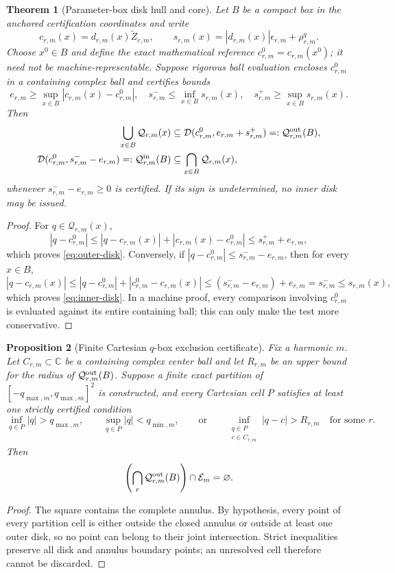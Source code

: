 \documentclass[11pt]{article}
\newtheorem{theorem}{Theorem}
\newtheorem{proposition}[theorem]{Proposition}
\theoremstyle{definition}
\theoremstyle{remark}
\newcommand{\C}{\mathbb C}
\newcommand{\Eset}{\mathcal E}
\begin{document}
\begin{theorem}[Parameter-box disk hull and core]
\label{thm:hull-core}
Let \(B\) be a compact box in the anchored certification coordinates and write
\[
 c_{r,m}(x)=d_{r,m}(x)\widetilde Z_{r,m},\qquad
 s_{r,m}(x)=|d_{r,m}(x)|\epsilon_{r,m}+\rho^q_{r,m}.
\]
Choose \(x^0\in B\) and define the exact mathematical reference
\(c^0_{r,m}=c_{r,m}(x^0)\); it need not be machine-representable.  Suppose
rigorous ball evaluation encloses \(c^0_{r,m}\) in a containing complex ball
and certifies bounds
\[
 e_{r,m}\ge\sup_{x\in B}|c_{r,m}(x)-c^0_{r,m}|,\quad
 s^-_{r,m}\le\inf_{x\in B}s_{r,m}(x),\quad
 s^+_{r,m}\ge\sup_{x\in B}s_{r,m}(x).
\]
Then
\begin{align}
 \bigcup_{x\in B}\mathcal Q_{r,m}(x)
 &\subseteq
 \mathcal D(c^0_{r,m},e_{r,m}+s^+_{r,m})
 =:\mathcal Q^{\rm out}_{r,m}(B),\label{eq:outer-disk}\\
 \mathcal D(c^0_{r,m},s^-_{r,m}-e_{r,m})
 =:\mathcal Q^{\rm in}_{r,m}(B)
 &\subseteq
 \bigcap_{x\in B}\mathcal Q_{r,m}(x),\label{eq:inner-disk}
\end{align}
whenever \(s^-_{r,m}-e_{r,m}\ge0\) is certified.  If its sign is
undetermined, no inner disk may be issued.
\end{theorem}
\begin{proof}
For \(q\in\mathcal Q_{r,m}(x)\),
\[
 |q-c^0_{r,m}|
 \le |q-c_{r,m}(x)|+|c_{r,m}(x)-c^0_{r,m}|
 \le s^+_{r,m}+e_{r,m},
\]
which proves \eqref{eq:outer-disk}.  Conversely, if
\(|q-c^0_{r,m}|\le s^-_{r,m}-e_{r,m}\), then for every \(x\in B\),
\[
 |q-c_{r,m}(x)|
 \le |q-c^0_{r,m}|+|c^0_{r,m}-c_{r,m}(x)|
 \le (s^-_{r,m}-e_{r,m})+e_{r,m}
 =s^-_{r,m}\le s_{r,m}(x),
\]
which proves \eqref{eq:inner-disk}.
In a machine proof, every comparison involving \(c^0_{r,m}\) is evaluated
against its entire containing ball; this can only make the test more
conservative.
\end{proof}

\begin{proposition}[Finite Cartesian \(q\)-box exclusion certificate]
\label{prop:qbox-cover}
Fix a harmonic \(m\).  Let \(C_{r,m}\subset\C\) be a containing complex
center ball and let \(R_{r,m}\) be an upper bound for the radius of
\(\mathcal Q^{\rm out}_{r,m}(B)\).  Suppose a finite exact partition of
\([-q_{\max,m},q_{\max,m}]^2\) is constructed, and every Cartesian cell
\(P\) satisfies at least one strictly certified condition
\[
 \inf_{q\in P}|q|>q_{\max,m},\qquad
 \sup_{q\in P}|q|<q_{\min,m},\qquad\text{or}\qquad
 \inf_{\substack{q\in P\\c\in C_{r,m}}}|q-c|>R_{r,m}
 \quad\text{for some }r.
\]
Then
\[
 \left(\bigcap_r\mathcal Q^{\rm out}_{r,m}(B)\right)
 \cap\Eset_m=\varnothing.
\]
\end{proposition}
\begin{proof}
The square contains the complete annulus.  By hypothesis, every point of
every partition cell is either outside the closed annulus or outside at least
one outer disk, so no point can belong to their joint intersection.  Strict
inequalities preserve all disk and annulus boundary points; an unresolved
cell therefore cannot be discarded.
\end{proof}
\end{document}
